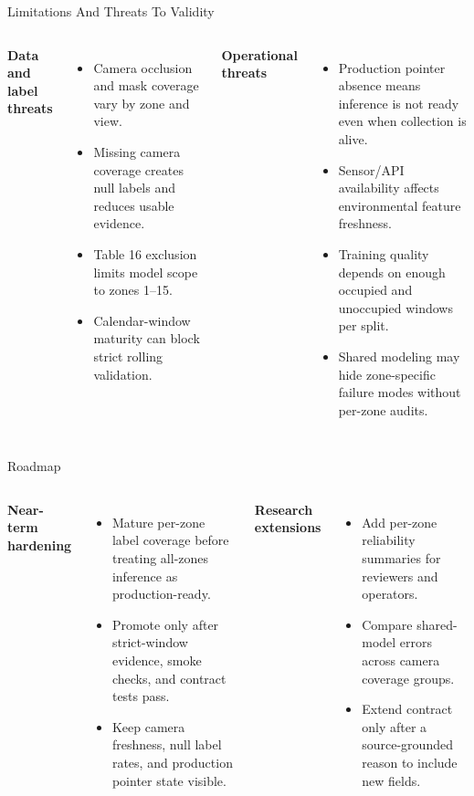 \documentclass[aspectratio=169]{beamer}
\begin{document}
\begin{frame}[shrink=4]{Limitations And Threats To Validity}
\begin{columns}[T,onlytextwidth]
\textbf{Data and label threats}
\begin{itemize}
  \item Camera occlusion and mask coverage vary by zone and view.
  \item Missing camera coverage creates null labels and reduces usable evidence.
  \item Table 16 exclusion limits model scope to zones 1--15.
  \item Calendar-window maturity can block strict rolling validation.
\end{itemize}

\textbf{Operational threats}
\begin{itemize}
  \item Production pointer absence means inference is not ready even when collection is alive.
  \item Sensor/API availability affects environmental feature freshness.
  \item Training quality depends on enough occupied and unoccupied windows per split.
  \item Shared modeling may hide zone-specific failure modes without per-zone audits.
\end{itemize}
\end{columns}
\end{frame}

\begin{frame}[shrink=4]{Roadmap}
\begin{columns}[T,onlytextwidth]
\textbf{Near-term hardening}
\begin{itemize}
  \item Mature per-zone label coverage before treating all-zones inference as production-ready.
  \item Promote only after strict-window evidence, smoke checks, and contract tests pass.
  \item Keep camera freshness, null label rates, and production pointer state visible.
\end{itemize}

\textbf{Research extensions}
\begin{itemize}
  \item Add per-zone reliability summaries for reviewers and operators.
  \item Compare shared-model errors across camera coverage groups.
  \item Extend contract only after a source-grounded reason to include new fields.
\end{itemize}
\end{columns}
\end{frame}
\end{document}
